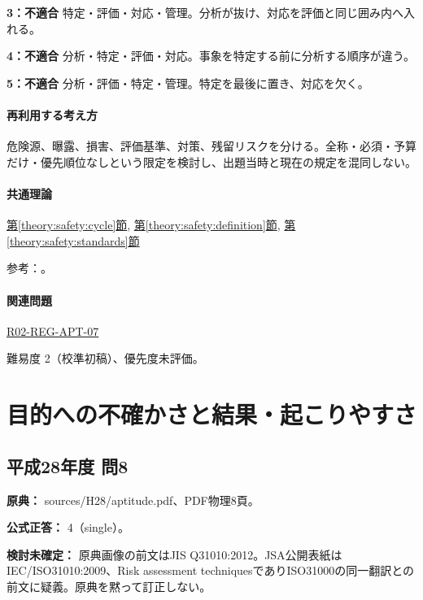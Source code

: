 \noindent\textbf{3：不適合} 特定・評価・対応・管理。分析が抜け、対応を評価と同じ囲み内へ入れる。\par

\noindent\textbf{4：不適合} 分析・特定・評価・対応。事象を特定する前に分析する順序が違う。\par

\noindent\textbf{5：不適合} 分析・評価・特定・管理。特定を最後に置き、対応を欠く。\par

\paragraph{再利用する考え方} 危険源、曝露、損害、評価基準、対策、残留リスクを分ける。全称・必須・予算だけ・優先順位なしという限定を検討し、出題当時と現在の規定を混同しない。

\paragraph{共通理論} \hyperref[theory:safety:cycle]{第\ref*{theory:safety:cycle}節}, \hyperref[theory:safety:definition]{第\ref*{theory:safety:definition}節}, \hyperref[theory:safety:standards]{第\ref*{theory:safety:standards}節}

\par 参考：\cite{saf_iso31000}。

\paragraph{関連問題} \hyperref[q:r02-reg-apt-07]{R02-REG-APT-07}

\par 難易度 2（校準初稿）、優先度未評価。

\section{目的への不確かさと結果・起こりやすさ}

\subsection{平成28年度 問8}
\label{q:h28-reg-apt-08}

\noindent\textbf{原典：} sources/H28/aptitude.pdf、PDF物理8頁。

\textbf{公式正答：} 4（single）。

\par\textbf{検討未確定：} 原典画像の前文はJIS Q31010:2012。JSA公開表紙はIEC/ISO31010:2009、Risk assessment techniquesでありISO31000の同一翻訳との前文に疑義。原典を黙って訂正しない。

